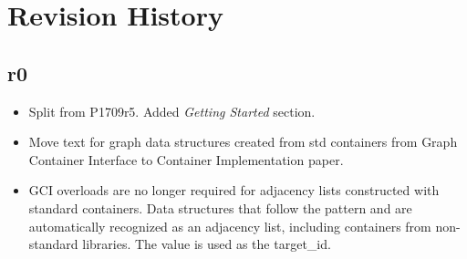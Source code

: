 \section{Revision History}

\subsection*{\paperno r0}

\begin{itemize}
      \item Split from P1709r5. Added \textit{Getting Started} section.
      \item Move text for graph data structures created from std containers from Graph Container Interface to 
            Container Implementation paper.
      \item GCI overloads are no longer required for adjacency lists constructed with standard containers. Data structures that follow
            the pattern  and 
            are automatically recognized as an adjacency list, including containers from non-standard libraries. The 
            value is used as the target\_id.
\end{itemize}

